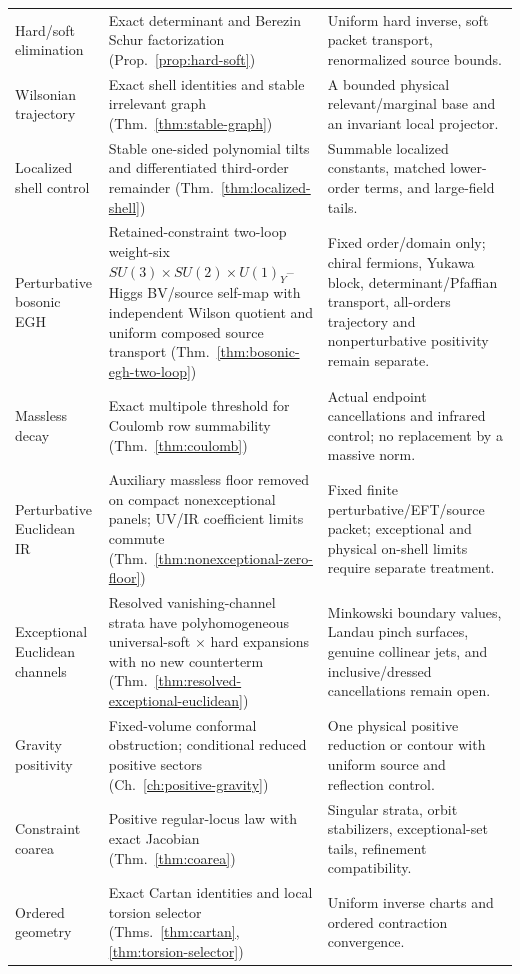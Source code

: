 \documentclass[11pt,a4paper,oneside]{book}
\theoremstyle{plain}
\theoremstyle{definition}
\theoremstyle{remark}
\begin{document}
\begin{longtable}{@{}>{\raggedright\arraybackslash}p{}>{\raggedright\arraybackslash}p{}>{\raggedright\arraybackslash}p{}@{}}
Hard/soft elimination & Exact determinant and Berezin Schur factorization (Prop.~\ref{prop:hard-soft}) & Uniform hard inverse, soft packet transport, renormalized source bounds.\\[1pt]
Wilsonian trajectory & Exact shell identities and stable irrelevant graph (Thm.~\ref{thm:stable-graph}) & A bounded physical relevant/marginal base and an invariant local projector.\\[1pt]
Localized shell control & Stable one-sided polynomial tilts and differentiated third-order remainder (Thm.~\ref{thm:localized-shell}) & Summable localized constants, matched lower-order terms, and large-field tails.\\[1pt]
Perturbative bosonic EGH & Retained-constraint two-loop weight-six $SU(3)\times SU(2)\times U(1)_Y$--Higgs BV/source self-map with independent Wilson quotient and uniform composed source transport (Thm.~\ref{thm:bosonic-egh-two-loop}) & Fixed order/domain only; chiral fermions, Yukawa block, determinant/Pfaffian transport, all-orders trajectory and nonperturbative positivity remain separate.\\[1pt]
Massless decay & Exact multipole threshold for Coulomb row summability (Thm.~\ref{thm:coulomb}) & Actual endpoint cancellations and infrared control; no replacement by a massive norm.\\[1pt]
Perturbative Euclidean IR & Auxiliary massless floor removed on compact nonexceptional panels; UV/IR coefficient limits commute (Thm.~\ref{thm:nonexceptional-zero-floor}) & Fixed finite perturbative/EFT/source packet; exceptional and physical on-shell limits require separate treatment.\\[1pt]
Exceptional Euclidean channels & Resolved vanishing-channel strata have polyhomogeneous universal-soft $\times$ hard expansions with no new counterterm (Thm.~\ref{thm:resolved-exceptional-euclidean}) & Minkowski boundary values, Landau pinch surfaces, genuine collinear jets, and inclusive/dressed cancellations remain open.\\[1pt]
Gravity positivity & Fixed-volume conformal obstruction; conditional reduced positive sectors (Ch.~\ref{ch:positive-gravity}) & One physical positive reduction or contour with uniform source and reflection control.\\[1pt]
Constraint coarea & Positive regular-locus law with exact Jacobian (Thm.~\ref{thm:coarea}) & Singular strata, orbit stabilizers, exceptional-set tails, refinement compatibility.\\[1pt]
Ordered geometry & Exact Cartan identities and local torsion selector (Thms.~\ref{thm:cartan}, \ref{thm:torsion-selector}) & Uniform inverse charts and ordered contraction convergence.\\[1pt]

\end{longtable}
\end{document}
